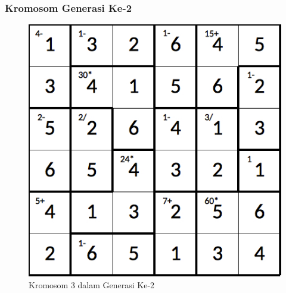 \documentclass{beamer}
\begin{document}
\note{

}

\begin{frame}
\frametitle{Kromosom Generasi Ke-2}
\begin{figure}
\centering
\captionsetup{justification=centering}
\includegraphics[scale=0.333]{Gambar/hybridgenetic/Generation2Chromosome3}
\caption[Kromosom 3 dalam Generasi Ke-2]{Kromosom 3 dalam Generasi Ke-2}
\label{fig:analisisg2k3}
\end{figure}
\end{frame}

\note{

}
\end{document}
